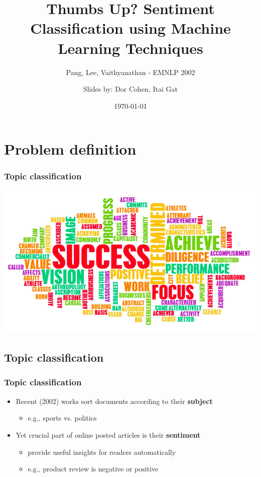 \documentclass{beamer}
\title{Thumbs Up? Sentiment Classification using Machine Learning Techniques}
\subtitle{Pang, Lee, Vaithyanathan - EMNLP 2002}
\author{Slides by: Dor Cohen, Itai Gat}
\institute{IE\&M @ Technion}
\date{\today}
\begin{document}
\begin{frame}
	\titlepage
\end{frame}

\section{Problem definition}



\begin{frame}
	\frametitle{Topic classification}
	\centering
	\includegraphics[scale=0.4]{word_cloud}
\end{frame}

\iffalse
\subsection{Topic classification}

\begin{frame}
	\frametitle{Topic classification}
	\begin{itemize}
	\item Recent (2002) works sort documents according to their \textbf{subject}
	\begin{itemize}
		\item e.g., sports vs. politics
	\end{itemize}
	\pause
	\item Yet crucial part of online posted articles is their \textbf{sentiment}
	\begin{itemize}
		\item provide useful insights for readers automatically
		\item e.g., product review is negative or positive
	\end{itemize}

	\end{itemize}
\end{frame}
\end{document}
